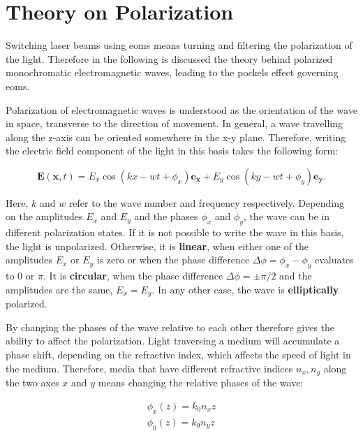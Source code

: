 \section{Theory on Polarization}%
\label{sec:pol}

Switching laser beams using \acp{eom} means turning and filtering the polarization of the light. Therefore in the following is discussed the theory behind polarized monochromatic electromagnetic waves, leading to the pockels effect governing \acp{eom}.

Polarization of electromagnetic waves is understood as the orientation of the wave in space, transverse to the direction of movement. In general, a wave travelling along the z-axis can be oriented somewhere in the x-y plane. Therefore, writing the electric field component of the light in this basis takes the following form:

\begin{equation}
	\mathbf{E}(\mathbf{x}, t) = E_x \cos\left(kx - wt + \phi_x\right) \mathbf{e_x} + E_y \cos\left(ky - wt + \phi_y\right) \mathbf{e_y}.
\end{equation}

Here, $k$ and $w$ refer to the wave number and frequency respectively.
Depending on the amplitudes $E_x$ and $E_y$ and the phases $\phi_x$ and $\phi_y$, the wave can be in different polarization states. If it is not possible to write the wave in this basis, the light is unpolarized. Otherwise, it is \textbf{linear}, when either one of the amplitudes $E_x$ or $E_y$ is zero or when the phase difference $\Delta \phi = \phi_x - \phi_y$ evaluates to 0 or $\pi$. It is \textbf{circular}, when the phase difference $\Delta \phi = \pm \pi/2$ and the amplitudes are the same, $E_x = E_y$. In any other case, the wave is \textbf{elliptically} polarized.

By changing the phases of the wave relative to each other therefore gives the ability to affect the polarization. Light traversing a medium will accumulate a phase shift, depending on the refractive index, which affects the speed of light in the medium. Therefore, media that have different refractive indices $n_x, n_y$ along the two axes $x$ and $y$ means changing the relative phases of the wave:

\begin{align}
	\label{eq:pol,phases}
	\phi_x(z) = k_0 n_x z \\
	\phi_y(z) = k_0 n_y z
\end{align}

